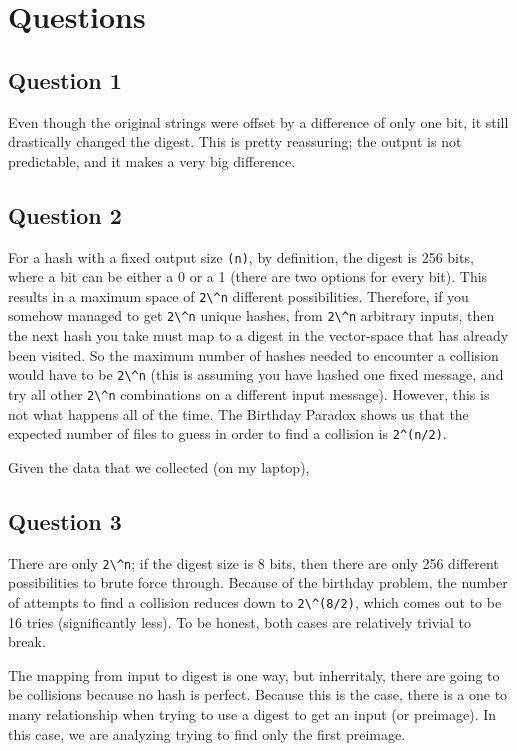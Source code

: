 \documentclass[11pt]{article}
\begin{document}
\section*{Questions}
\subsection*{Question 1}

Even though the original strings were offset by a difference of only one bit, it still drastically changed the digest. This is pretty reassuring; the output is not predictable, and it makes a very big difference.

\subsection*{Question 2}

For a hash with a fixed output size \verb|(n)|, by definition, the digest is 256 bits, where a bit can be either a 0 or a 1 (there are two options for every bit). This results in a maximum space of \verb|2\^n| different possibilities. Therefore, if you somehow managed to get \verb|2\^n| unique hashes, from \verb|2\^n| arbitrary inputs, then the next hash you take must map to a digest in the vector-space that has already been visited. So the maximum number of hashes needed to encounter a collision would have to be \verb|2\^n| (this is assuming you have hashed one fixed message, and try all other \verb|2\^n| combinations on a different input message). However, this is not what happens all of the time. The Birthday Paradox shows us that the expected number of files to guess in order to find a collision is \verb|2^(n/2)|.

Given the data that we collected (on my laptop),


\subsection*{Question 3}

There are only \verb|2\^n|; if the digest size is 8 bits, then there are only 256 different possibilities to brute force through. Because of the birthday problem, the number of attempts to find a collision reduces down to \verb|2\^(8/2)|, which comes out to be 16 tries (significantly less). To be honest, both cases are relatively trivial to break.

The mapping from input to digest is one way, but inherritaly, there are going to be collisions because no hash is perfect. Because this is the case, there is a one to many relationship when trying to use a digest to get an input (or preimage). In this case, we are analyzing trying to find only the first preimage. 
\end{document}
